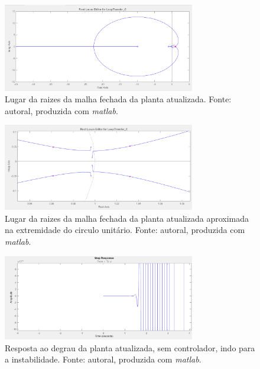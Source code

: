 \documentclass{ifacconf}
\begin{document}
\begin{figure}[!htb]
  \begin{center}
  \includegraphics[width=8.4cm]{figures/lugar_raizes_mf_corrigida.png}    %
  \caption{Lugar da raizes da malha fechada da planta atualizada. Fonte: autoral, produzida com \textit{matlab}.} 
  \label{fig:lugar_raizes_mf_atualizada}
  \end{center}
\end{figure}

\begin{figure}[!htb]
  \begin{center}
  \includegraphics[width=8.4cm]{figures/lugar_raizes_mf_corrigida_aproximada.png}    %
  \caption{Lugar da raizes da malha fechada da planta atualizada aproximada na extremidade do circulo unitário. Fonte: autoral, produzida com \textit{matlab}.} 
  \label{fig:lugar_raizes_mf_atualizada_zoom}
  \end{center}
\end{figure}

\begin{figure}[!htb]
  \begin{center}
  \includegraphics[width=8.4cm]{figures/resposta_degrau_mf_atualizado.png}    %
  \caption{Resposta ao degrau da planta atualizada, sem controlador, indo para a instabilidade. Fonte: autoral, produzida com \textit{matlab}.} 
  \label{fig:resposta_Degrau_mf_atualizada}
  \end{center}
\end{figure}
\end{document}
